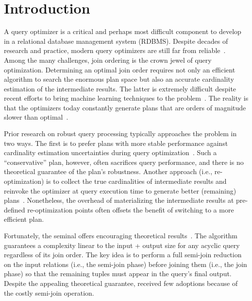 \section{Introduction}
\label{sec:intro}

A query optimizer is a critical and perhaps most difficult component to develop in a relational database management system (RDBMS). Despite decades of research and practice, modern query optimizers are still far from reliable~\cite{leis2015HowGood}. Among the many challenges, join ordering is the crown jewel of query optimization. Determining an optimal join order requires not only an efficient algorithm to search the enormous plan space but also an accurate cardinality estimation of the intermediate results. The latter is extremely difficult despite recent efforts to bring machine learning techniques to the problem~\cite{2020are_we_ready, lehmann2023IsLearned}. The reality is that the optimizers today constantly generate plans that are orders of magnitude slower than optimal~\cite{2014optimizationsolved?, 2019tutorial_robust, 2021survey_optimizer}.

Prior research on robust query processing typically approaches the problem in two ways. The first is to prefer plans with more stable performance against cardinality estimation uncertainties during query optimization~\cite{2002LEC, 2005RCE, 2007plan_diagram, 2008strict_plan_diagram}. Such a ``conservative'' plan, however, often sacrifices query performance, and there is no theoretical guarantee of the plan's robustness. Another approach (i.e., re-optimization) is to collect the true cardinalities of intermediate results and reinvoke the optimizer at query execution time to generate better (remaining) plans~\cite{1998reopt, 2000eddies, 2004pop, Perron19, 2023reopt_zhao, justen2024polar}. Nonetheless, the overhead of materializing the intermediate results at pre-defined re-optimization points often offsets the benefit of switching to a more efficient plan.

Fortunately, the seminal \YannAlg offers encouraging theoretical results~\cite{yannakakis1981YA}. The algorithm guarantees a complexity linear to the input + output size for any acyclic query regardless of its join order. The key idea is to perform a full semi-join reduction on the input relations (i.e., the semi-join phase) before joining them (i.e., the join phase) so that the remaining tuples must appear in the query's final output. Despite the appealing theoretical guarantee, \YannAlg received few adoptions because of the costly semi-join operation.

